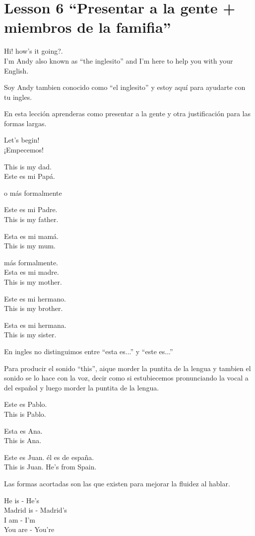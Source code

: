 \section{Lesson 6 ``Presentar a la gente + miembros de la famifia''}

Hi! how's it going?.\\
I'm Andy also known as ``the inglesito'' and I'm here to help you with your
English.

Soy Andy tambien conocido como ``el inglesito'' y estoy aquí para ayudarte con
tu ingles.

En esta lección aprenderas como presentar a la gente y otra justificación
para las formas largas.

Let's begin!\\
¡Empecemos!

This is my dad.\\
Este es mi Papá.

o más formalmente

Este es mi Padre.\\
This is my father.

Esta es mi mamá.\\
This is my mum.

más formalmente.\\
Esta es mi madre.\\
This is my mother.

Este es mi hermano.\\
This is my brother.

Esta es mi hermana.\\
This is my sister.

En ingles no distinguimos entre ``esta es...'' y ``este es...''

Para producir el sonido ``this'', aique morder la puntita de la lengua y
tambien el sonido se lo hace con la voz, decir como si estubiecemos
pronunciando la vocal a del español y luego morder la puntita de la lengua.

Este es Pablo.\\
This is Pablo.

Esta es Ana.\\
This is Ana.

Este es Juan. él es de españa.\\
This is Juan. He's from Spain.

Las formas acortadas son las que existen para mejorar la fluidez al hablar.

He is - He's\\
Madrid is - Madrid's\\
I am - I'm\\
You are - You're\\

